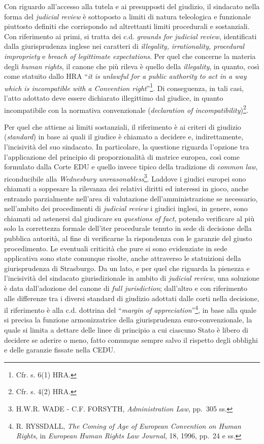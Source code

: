 \documentclass[12pt,it,a4paper,]{report}
\begin{document}
Con riguardo all'accesso alla tutela e ai presupposti del giudizio, il
sindacato nella forma del \emph{judicial review} è sottoposto a limiti
di natura teleologica e funzionale piuttosto definiti che corrispondo ad
altrettanti limiti procedurali e sostanziali. Con riferimento ai primi,
si tratta dei c.d. \emph{grounds for judicial review}, identificati
dalla giurisprudenza inglese nei caratteri di \emph{illegality,
irrationality, procedural impropriety} e \emph{breach of legittimate
expectations}. Per quel che concerne la materia degli \emph{human
rights}, il canone che più rileva è quello della \emph{illegality}, in
quanto, così come statuito dallo HRA ``\emph{it is unlawful for a public
authority to act in a way which is incompatible with a Convention
right}''\footnote{Cfr. s. 6(1) HRA.}. Di conseguenza, in tali casi,
l'atto adottato deve essere dichiarato illegittimo dal giudice, in
quanto incompatibile con la normativa convenzionale (\emph{declaration
of incompatibility})\footnote{Cfr. s. 4(2) HRA.}.

Per quel che attiene ai limiti sostanziali, il riferimento è ai criteri
di giudizio (\emph{standard}) in base ai quali il giudice è chiamato a
decidere e, indirettamente, l'incisività del suo sindacato. In
particolare, la questione riguarda l'opzione tra l'applicazione del
principio di proporzionalità di matrice europea, così come formulato
dalla Corte EDU e quello invece tipico della tradizione di \emph{common
law}, riconducibile alla \emph{Wednesbury unreasonabless}\footnote{H.W.R.
  WADE - C.F. FORSYTH, \emph{Administration Law}, pp.~305 ss.}. Laddove
i giudici europei sono chiamati a soppesare la rilevanza dei relativi
diritti ed interessi in gioco, anche entrando parzialmente nell'area di
valutazione dell'amministrazione se necessario, nell'ambito dei
procedimenti di \emph{judicial review} i giudici inglesi, in genere,
sono chiamati ad astenersi dal giudicare su \emph{questions of fact},
potendo verificare al più solo la correttezza formale dell'iter
procedurale tenuto in sede di decisione della pubblica autorità, al fine
di verificarne la rispondenza con le garanzie del giusto procedimento.
Le eventuali criticità che pure si sono evidenziate in sede applicativa
sono state comunque risolte, anche attraverso le statuizioni della
giurisprudenza di Strasburgo. Da un lato, e per quel che riguarda la
pienezza e l'incisività del sindacato giurisdizionale in ambito di
\emph{judicial review}, una soluzione è data dall'adozione del canone di
\emph{full jurisdiction}; dall'altro e con riferimento alle differenze
tra i diversi standard di giudizio adottati dalle corti nella decisione,
il riferimento è alla c.d. dottrina del ``\emph{margin of
appreciation}''\footnote{R. RYSSDALL, \emph{The Coming of Age of
  European Convention on Human Rights}, in \emph{European Human Rights
  Law Journal}, 18, 1996, pp.~24 e ss.}, in base alla quale si precisa
la funzione armonizzatrice della giurisprudenza euro-convenzionale, la
quale si limita a dettare delle linee di principio a cui ciascuno Stato
è libero di decidere se aderire o meno, fatto comunque sempre salvo il
rispetto degli obblighi e delle garanzie fissate nella CEDU.
\end{document}
